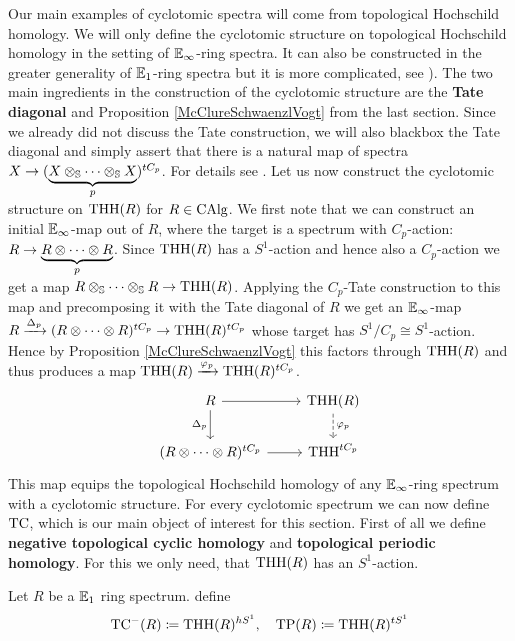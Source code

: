 Our main examples of cyclotomic spectra will 
come from topological Hochschild homology.
We will only define the cyclotomic structure on topological Hochschild homology in the setting of $\mathbb{E}_\infty$-ring spectra. It can also be constructed in the greater generality of $\mathbb{E}_1$-ring spectra but it is more complicated, see \cite[Chapter~3.1]{NS}).
The two main ingredients in the construction of the cyclotomic structure are the \textbf{Tate diagonal} and Proposition \ref{McClureSchwaenzlVogt} from the last section. Since we already did not discuss the Tate construction, we will also blackbox the Tate diagonal and simply assert that there is a natural map of spectra $X\rightarrow (\underbrace{X\otimes_{\mathbb{S}}\dots\otimes_{\mathbb{S}} X}_{p})^{tC_p}$.
For details see \cite[Section~3.1]{NS}.
Let us now construct the cyclotomic structure on $\operatorname{THH}(R)$ for $R\in \operatorname{CAlg}$. 
We first note that we can construct an initial $\mathbb{E}_\infty$-map out of $R$, where the target is a spectrum with $C_p$-action: $R\rightarrow \underbrace{R\otimes\dots\otimes R}_{p}$.
Since $\operatorname{THH}(R)$ has a $S^1$-action and hence also a $C_p$-action we get a map $R\otimes_{\mathbb{S}}\dots\otimes_{\mathbb{S}} R\rightarrow \operatorname{THH}(R)$. Applying the $C_p$-Tate construction to this map and precomposing it with the Tate diagonal of $R$ we get an $\mathbb{E}_\infty$-map $R\xrightarrow{\Delta_p} (R\otimes\dots\otimes R)^{tC_p}\rightarrow \operatorname{THH}(R)^{tC_p}$ whose target has $S^1/C_p\cong S^1$-action.
\\
Hence by Proposition \ref{McClureSchwaenzlVogt} this factors through $\operatorname{THH}(R)$ and thus produces a map $\operatorname{THH}(R)\xrightarrow{\varphi_p} \operatorname{THH}(R)^{tC_p}$.
\[\begin{tikzcd}
	{R} & {\text{THH}(R)} \\
	{(R\otimes\dots\otimes R)^{tC_p}} & {\text{THH}^{tC_p}}
	\arrow[from=1-1, to=1-2]
	\arrow["{\varphi_p}", from=1-2, to=2-2, dashed]
	\arrow["{\Delta_p}"', from=1-1, to=2-1]
	\arrow[from=2-1, to=2-2]
\end{tikzcd}\]
This map equips the topological Hochschild homology of any $\mathbb{E}_\infty$-ring spectrum with a cyclotomic structure. 
For every cyclotomic spectrum we can now define $\operatorname{TC}$, which is our main object of interest for this section.
First of all we define \textbf{negative topological cyclic homology} and \textbf{topological periodic  homology}. For this we only need, that $\operatorname{THH}(R)$ has an $S^1$-action.
\begin{defn}
    Let $R$ be a $\mathbb{E}_1$ ring spectrum. define
        \begin{equation*}
          \operatorname{TC}^{-}(R)\coloneqq \operatorname{THH}(R)^{hS^1},\quad   \operatorname{TP}(R)\coloneqq \operatorname{THH}(R)^{tS^1}
        \end{equation*} 
\end{defn}
